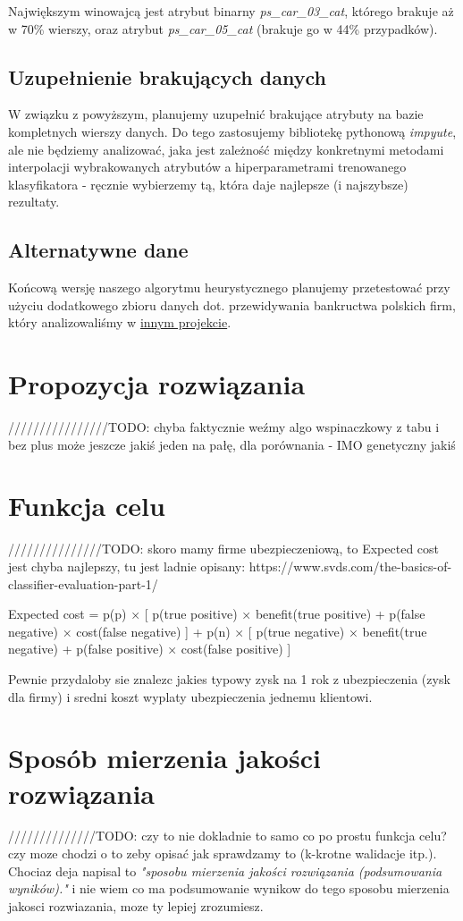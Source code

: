 \documentclass[11pt]{article}
\begin{document}
Największym winowajcą jest atrybut binarny \textsl{ps\_car\_03\_cat}, którego brakuje aż w 70\% wierszy, oraz atrybut \textsl{ps\_car\_05\_cat} (brakuje go w 44\% przypadków).

\subsection{Uzupełnienie brakujących danych}
W związku z powyższym, planujemy uzupełnić brakujące atrybuty na bazie kompletnych wierszy danych. Do tego zastosujemy bibliotekę pythonową \textsl{impyute}, ale nie będziemy analizować, jaka jest zależność między konkretnymi metodami interpolacji wybrakowanych atrybutów a hiperparametrami trenowanego klasyfikatora - ręcznie wybierzemy tą, która daje najlepsze (i najszybsze) rezultaty.

\subsection{Alternatywne dane}
Końcową wersję naszego algorytmu heurystycznego planujemy przetestować przy użyciu dodatkowego zbioru danych dot. przewidywania bankructwa polskich firm, który analizowaliśmy w \href{https://github.com/przestaw/Data_Mining_Bancrupcy}{innym projekcie}.


\section{Propozycja rozwiązania}
////////////////TODO: chyba faktycznie weźmy algo wspinaczkowy z tabu i bez plus może jeszcze jakiś jeden na pałę, dla porównania - IMO genetyczny jakiś

\section{Funkcja celu}
///////////////TODO: skoro mamy firme ubezpieczeniową, to Expected cost jest chyba najlepszy, tu jest ladnie opisany:
https://www.svds.com/the-basics-of-classifier-evaluation-part-1/

Expected cost = p(p) × [ p(true positive) × benefit(true positive)
                        + p(false negative) × cost(false negative) ]
              + p(n) × [ p(true negative) × benefit(true negative)
                        + p(false positive) × cost(false positive) ]
                        
Pewnie przydaloby sie znalezc jakies typowy zysk na 1 rok z ubezpieczenia (zysk dla firmy) i sredni koszt wyplaty ubezpieczenia jednemu klientowi. 

\section{Sposób mierzenia jakości rozwiązania}
//////////////TODO: czy to nie dokladnie to samo co po prostu funkcja celu? czy moze chodzi o to zeby opisać jak sprawdzamy to (k-krotne walidacje itp.).
Chociaz deja napisal to \textsl{"sposobu mierzenia jakości rozwiązania (podsumowania wyników)."} i nie wiem co ma podsumowanie wynikow do tego sposobu mierzenia jakosci rozwiazania, moze ty lepiej zrozumiesz.
\end{document}
